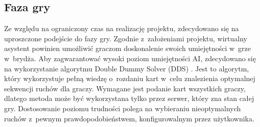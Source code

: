 \FloatBarrier

\subsection{Faza gry}

Ze względu na ograniczony czas na realizację projektu,
zdecydowano się na uproszczone podejście do fazy gry.
Zgodnie z~założeniami projektu, wirtualny asystent powinien umożliwić
graczom doskonalenie swoich umiejętności w~grze w~brydża.
Aby zagwarantować wysoki poziom umiejętności AI, zdecydowano się
na wykorzystanie algorytmu Double Dummy Solver (DDS) \cite{DDS}.
Jest to algorytm, który wykorzystuje pełną wiedzę o~rozdaniu kart
w~celu znalezienia optymalnej sekwencji ruchów dla graczy.
Wymagane jest podanie kart wszystkich graczy, dlatego
metoda może być wykorzystana tylko przez serwer, który zna stan całej gry.
Dostosowanie poziomu trudności polega na wybieraniu nieoptymalnych ruchów
z~pewnym prawdopodobieństwem, konfigurowalnym przez użytkownika.

